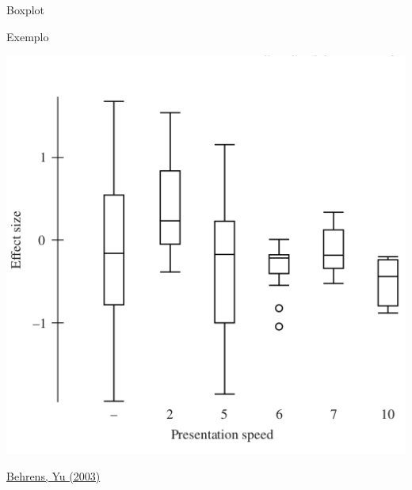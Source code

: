 \documentclass{beamer}
\begin{document}
\begin{frame}{Boxplot}
  \begin{exampleblock}{Exemplo}
    \begin{center}
      \includegraphics[height=0.7\textheight]{EDA/eda-boxplot2}
    \end{center}
  \end{exampleblock}

  \vfill
  \scriptsize
  \hfill \href{https://doi.org/10.1002/0471264385.wei0202}
  {Behrens, Yu (2003)}
\end{frame}
\end{document}
